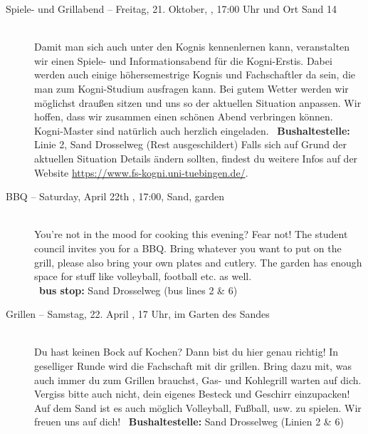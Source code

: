 \begin{description}
\ifkogwiss
    \item[Spiele- und Grillabend -- Freitag, 21. Oktober, \YEAR, 17:00 Uhr und Ort Sand 14]\ \\
	Damit man sich auch unter den Kognis kennenlernen kann, veranstalten wir einen Spiele- und Informationsabend für die Kogni-Erstis. Dabei werden auch einige höhersemestrige Kognis und Fachschaftler da sein, die man zum Kogni-Studium ausfragen kann. Bei gutem Wetter werden wir möglichst draußen sitzen und uns so der aktuellen Situation anpassen. Wir hoffen, dass wir zusammen einen schönen Abend verbringen können. Kogni-Master sind natürlich auch herzlich eingeladen.
	~\textbf{Bushaltestelle:} Linie 2, Sand Drosselweg (Rest ausgeschildert)
	Falls sich auf Grund der aktuellen Situation Details ändern sollten, findest du weitere Infos auf der Website \url{https://www.fs-kogni.uni-tuebingen.de/}.
\fi


\ifml
	\item[BBQ -- Saturday, April 22th \YEAR, 17:00, Sand, garden]~\\
	You're not in the mood for cooking this evening? Fear not!
    The student council invites you for a BBQ. Bring whatever you want to put on the grill,
    please also bring your own plates and cutlery. The garden has enough space for stuff like volleyball, football etc. as well.\\
	~\textbf{bus stop:} Sand Drosselweg (bus lines 2 \& 6)
\else
	\item[Grillen -- Samstag, 22. April \YEAR, 17 Uhr, im Garten des Sandes]~\\
	Du hast keinen Bock auf Kochen? Dann bist du hier genau richtig! In geselliger Runde wird die Fachschaft mit dir grillen.
	Bring dazu mit, was auch immer du zum Grillen brauchst, Gas- und Kohlegrill warten auf dich. Vergiss bitte auch nicht, dein eigenes Besteck und Geschirr einzupacken!\\
	Auf dem Sand ist es auch möglich Volleyball, Fußball, usw. zu spielen. Wir freuen uns auf dich!
	~\textbf{Bushaltestelle:} Sand Drosselweg (Linien 2 \& 6)
\fi


\end{description}
